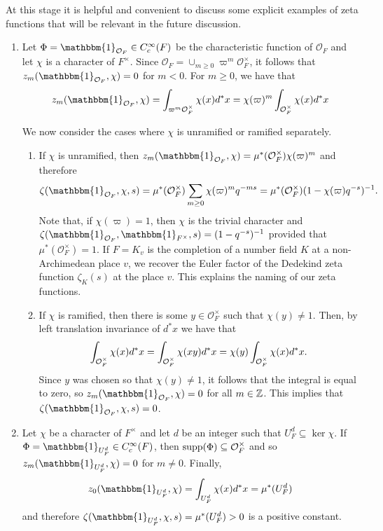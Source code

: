 \begin{example}\label{example:zetafnc}
    At this stage it is helpful and convenient to discuss some explicit examples of zeta functions that will be relevant in the future discussion.
    \begin{enumerate}[(1)]
        \item Let $\Phi=\mathbbm{1}_{\mathcal{O}_F}\in C_c^\infty(F)$ be the characteristic function of $\mathcal{O}_F$ and let $\chi$ is a character of $F^\times$. Since $\mathcal{O}_F=\cup_{m\geq0}\varpi^m\mathcal{O}_F^\times$, it follows that $z_m(\mathbbm{1}_{\mathcal{O}_F},\chi)=0$ for $m<0$. For $m\geq 0$, we have that 
        $$z_m(\mathbbm{1}_{\mathcal{O}_F},\chi)=\int_{\varpi^m \mathcal O_F^\times} \chi(x)d^*x=\chi(\varpi)^m\int_{\mathcal{O}_F^\times}\chi(x)d^*x$$
        
        We now consider the cases where $\chi$ is unramified or ramified separately.
        \begin{enumerate}
            \item If $\chi$ is unramified, then $z_m(\mathbbm{1}_{\mathcal{O}_F},\chi)=\mu^*(\mathcal{O}_F^\times)\chi(\varpi)^m$
            and therefore $$\zeta(\mathbbm{1}_{\mathcal{O}_F},\chi,s)=\mu^*(\mathcal{O}_F^\times)\sum_{m\geq0}\chi(\varpi)^mq^{-ms}=\mu^*(\mathcal{O}_F^\times)(1-\chi(\varpi)q^{-s})^{-1}.$$
            Note that, if $\chi(\varpi)=1$, then $\chi$ is the trivial character and $\zeta(\mathbbm{1}_{\mathcal{O}_F},\mathbbm{1}_{F^\times},s)=(1-q^{-s})^{-1}$ provided that $\mu^*(\mathcal{O}_F^\times)=1$. If $F=K_v$ is the completion of a number field $K$ at a non-Archimedean place $v$, we recover the Euler factor of the Dedekind zeta function $\zeta_K(s)$ at the place $v$. This explains the naming of our zeta functions. 
            \item If $\chi$ is ramified, then there is some $y\in\mathcal{O}_F^\times$ such that $\chi(y)\neq 1$. Then, by left translation invariance of $d^*x$ we have that
            $$\int_{\mathcal O_F^\times} \chi(x)d^*x = \int_{\mathcal O_F^\times} \chi(xy)d^*x = \chi(y)\int_{\mathcal{O}_F^\times} \chi(x) d^*x.$$
            Since $y$ was chosen so that $\chi(y)\neq 1$, it follows that 
            the integral is equal to zero, so $z_m(\mathbbm{1}_{\mathcal{O}_F},\chi)=0$ for all $m\in\mathbb{Z}$. This implies that $\zeta(\mathbbm{1}_{\mathcal{O}_F},\chi,s)=0$.
        \end{enumerate}

        \item Let $\chi$ be a character of $F^\times$ and let $d$ be an integer such that $U_F^d\subseteq\ker\chi$. If $\Phi=\mathbbm{1}_{U_F^d}\in C_c^\infty(F)$, then $\mathrm{supp}(\Phi)\subseteq\mathcal{O}_F^\times$ and so $z_m(\mathbbm{1}_{U_F^d},\chi)=0$ for $m\neq0$. Finally, 
        $$z_0(\mathbbm{1}_{U_F^d},\chi)=\int_{U_F^d}\chi(x)d^*x=\mu^*(U_F^d)$$
        and therefore $\zeta(\mathbbm{1}_{U_F^d},\chi,s)=\mu^*(U_F^d)>0$ is a positive constant.       
    \end{enumerate}
\end{example}


